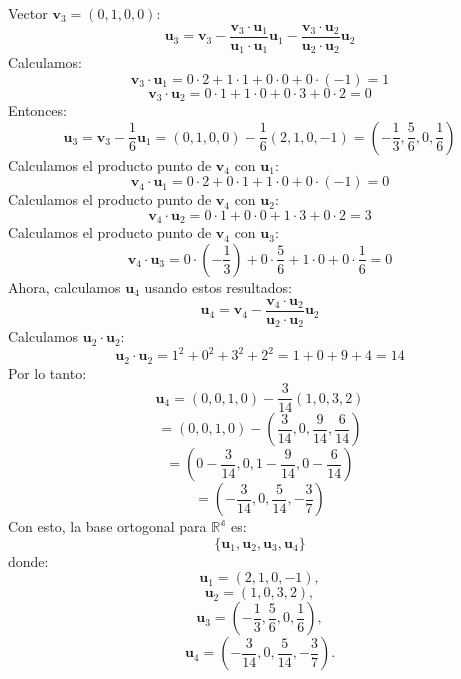 \begin{solution}
Vector \( \mathbf{v}_3 = (0, 1, 0, 0) \):
\[
   \mathbf{u}_3 = \mathbf{v}_3 - \frac{\mathbf{v}_3 \cdot \mathbf{u}_1}{\mathbf{u}_1 \cdot \mathbf{u}_1} \mathbf{u}_1 - \frac{\mathbf{v}_3 \cdot \mathbf{u}_2}{\mathbf{u}_2 \cdot \mathbf{u}_2} \mathbf{u}_2
   \]
Calculamos:
\[
   \mathbf{v}_3 \cdot \mathbf{u}_1 = 0 \cdot 2 + 1 \cdot 1 + 0 \cdot 0 + 0 \cdot (-1) = 1
   \]
\[
   \mathbf{v}_3 \cdot \mathbf{u}_2 = 0 \cdot 1 + 1 \cdot 0 + 0 \cdot 3 + 0 \cdot 2 = 0
   \]
Entonces:
\[
   \mathbf{u}_3 = \mathbf{v}_3 - \frac{1}{6} \mathbf{u}_1 = \left(0, 1, 0, 0\right) - \frac{1}{6} \left(2, 1, 0, -1\right) = \left(-\frac{1}{3}, \frac{5}{6}, 0, \frac{1}{6}\right)
   \]
Calculamos el producto punto de $\textbf{v}_4$ con $\textbf{u}_1$​:
\[
   \mathbf{v}_4 \cdot \mathbf{u}_1 = 0 \cdot 2 + 0 \cdot 1 + 1 \cdot 0 + 0 \cdot (-1) = 0
   \]
Calculamos el producto punto de \( \mathbf{v}_4 \) con \( \mathbf{u}_2 \):
\[
   \mathbf{v}_4 \cdot \mathbf{u}_2 = 0 \cdot 1 + 0 \cdot 0 + 1 \cdot 3 + 0 \cdot 2 = 3
   \]
Calculamos el producto punto de \( \mathbf{v}_4 \) con \( \mathbf{u}_3 \):
\[
   \mathbf{v}_4 \cdot \mathbf{u}_3 = 0 \cdot \left(-\frac{1}{3}\right) + 0 \cdot \frac{5}{6} + 1 \cdot 0 + 0 \cdot \frac{1}{6} = 0
   \]
Ahora, calculamos \( \mathbf{u}_4 \) usando estos resultados:
\[
\mathbf{u}_4 = \mathbf{v}_4 - \frac{\mathbf{v}_4 \cdot \mathbf{u}_2}{\mathbf{u}_2 \cdot \mathbf{u}_2} \mathbf{u}_2
\]
Calculamos \( \mathbf{u}_2 \cdot \mathbf{u}_2 \):
\[
\mathbf{u}_2 \cdot \mathbf{u}_2 = 1^2 + 0^2 + 3^2 + 2^2 = 1 + 0 + 9 + 4 = 14
\]
Por lo tanto:
\[
\mathbf{u}_4 = \left(0, 0, 1, 0\right) - \frac{3}{14} \left(1, 0, 3, 2\right)
\]
\[
= \left(0, 0, 1, 0\right) - \left(\frac{3}{14}, 0, \frac{9}{14}, \frac{6}{14}\right)
\]
\[
= \left(0 - \frac{3}{14}, 0, 1 - \frac{9}{14}, 0 - \frac{6}{14}\right)
\]
\[
= \left(-\frac{3}{14}, 0, \frac{5}{14}, -\frac{3}{7}\right)
\]
Con esto, la base ortogonal para $\mathbb{R^4}$ es:
\[
\{\mathbf{u}_1, \mathbf{u}_2, \mathbf{u}_3, \mathbf{u}_4\}
\]
donde:
\[
\mathbf{u}_1 = (2, 1, 0, -1),
\]
\[
\mathbf{u}_2 = (1, 0, 3, 2),
\]
\[
\mathbf{u}_3 = \left(-\frac{1}{3}, \frac{5}{6}, 0, \frac{1}{6}\right),
\]
\[
\mathbf{u}_4 = \left(-\frac{3}{14}, 0, \frac{5}{14}, -\frac{3}{7}\right).
\]
\end{solution}